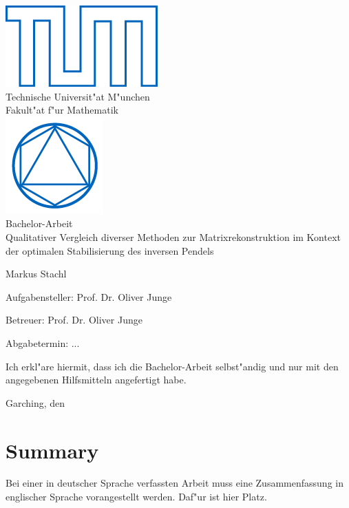 \documentclass[12pt,a4paper,twoside]{article}
\begin{document}
\pagestyle{empty}
\begin{titlepage}
\begin{center}
\includegraphics{TUMblau.png}\\[3mm]
\sf
{\Large
  Technische Universit"at M"unchen\\[5mm]
  Fakult"at f"ur Mathematik\\[8mm]
}
\normalsize
\includegraphics{MA_Web.png}\\[15mm]

Bachelor-Arbeit\\[15mm]

{\LARGE
Qualitativer Vergleich diverser Methoden zur Matrixrekonstruktion im Kontext der optimalen Stabilisierung des inversen Pendels
}
\bigskip

\normalsize

Markus Stachl
\end{center}
\vspace*{75mm}

Aufgabensteller: Prof. Dr. Oliver Junge
\medskip

Betreuer: Prof. Dr. Oliver Junge
\medskip

Abgabetermin: ...

\end{titlepage}

\vspace*{150mm}

Ich erkl"are hiermit, dass ich die Bachelor-Arbeit selbst"andig und nur mit den angegebenen
Hilfsmitteln angefertigt habe.
\bigskip

Garching, den
\newpage
\section*{Summary}
Bei einer in deutscher Sprache verfassten Arbeit muss eine Zusammenfassung in englischer Sprache vorangestellt werden.
Daf"ur ist hier Platz.
\end{document}
